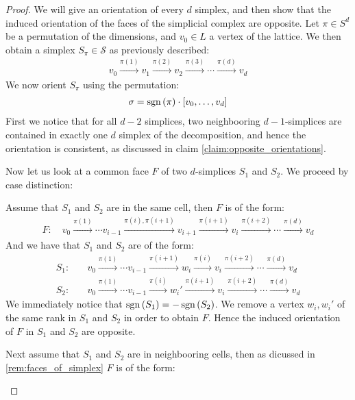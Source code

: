 \begin{proof}
	We will give an orientation of every $d$ simplex, and then show that the induced orientation of the faces of the simplicial complex are opposite.
	Let $\pi \in S^d$ be a permutation of the dimensions, and $v_0 \in L$ a vertex of the lattice. We then obtain a simplex $S_{\pi} \in \mathcal{S}$ as previously described:
	\begin{align*}
		v_0 \xrightarrow{\pi(1)} v_1 \xrightarrow{\pi(2)} v_2 \xrightarrow{\pi(3)} \cdots \xrightarrow{\pi(d)} v_d
	\end{align*}
	We now orient $S_{\pi}$ using the permutation:
	\begin{align*}
		\sigma = \operatorname{sgn}\left(\pi\right) \cdot [v_0, \dots, v_d]
	\end{align*}
	First we notice that for all $d-2$ simplices, two neighbooring $d-1$-simplices are contained  in exactly one $d$ simplex of the decomposition, and hence the orientation is consistent, as discussed in claim \ref{claim:opposite_orientations}. \par
	Now let us look at a common face $F$ of two $d$-simplices $S_1$ and $S_2$. We proceed by case distinction:
	\begin{case}{1}
		Assume that $S_1$ and $S_2$ are in the same cell, then $F$ is of the form:
		\begin{align*}
			F: \quad v_0 \xrightarrow{\pi(1)}  \cdots v_{i-1} \xrightarrow{\pi(i), \pi(i+1)} v_{i+1} \xrightarrow{\pi(i+1)} v_{i} \xrightarrow{\pi(i+2)} \cdots \xrightarrow{\pi(d)} v_d
		\end{align*}
		And we have that $S_1$ and $S_2$ are of the form:
		\begin{align*}
			S_1: \quad & v_0 \xrightarrow{\pi(1)} \cdots v_{i-1} \xrightarrow{\pi(i+1)} w_i \xrightarrow{\pi(i)} v_{i} \xrightarrow{\pi(i+2)} \cdots \xrightarrow{\pi(d)} v_d  \\
			S_2: \quad & v_0 \xrightarrow{\pi(1)} \cdots v_{i-1} \xrightarrow{\pi(i)} w_i' \xrightarrow{\pi(i+1)} v_{i} \xrightarrow{\pi(i+2)} \cdots \xrightarrow{\pi(d)} v_d
		\end{align*}
		We immediately notice that $\operatorname{sgn}\left(S_1\right) = - \operatorname{sgn}\left(S_2\right)$. We remove a vertex $w_i, w_i'$ of the same rank in $S_1$ and $S_2$ in order to obtain $F$. Hence the induced orientation of $F$ in $S_1$ and $S_2$ are opposite.
	\end{case}
	\begin{case}{2}
		Next assume that $S_1$ and $S_2$ are in neighbooring cells, then as dicussed in \cref{rem:faces_of_simplex} $F$ is of the form:

\end{case}
\end{proof}
